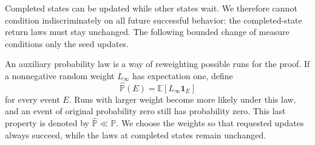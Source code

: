 Completed states can be updated while other states wait. We therefore cannot condition
indiscriminately on all future successful behavior: the completed-state return laws must stay
unchanged. The following bounded change of measure conditions only the seed updates.

An auxiliary probability law is a way of reweighting possible runs for the proof. If a nonnegative random weight $L_\infty$ has expectation one, define
\[
\widehat{\mathbb P}(E)=\mathbb E[L_\infty\mathbf1_E]
\]
for every event $E$. Runs with larger weight become more likely under this law, and an event of original probability zero still has probability zero. This last property is denoted by $\widehat{\mathbb P}\ll\mathbb P$. We choose the weights so that requested updates always succeed, while the laws at completed states remain unchanged.

